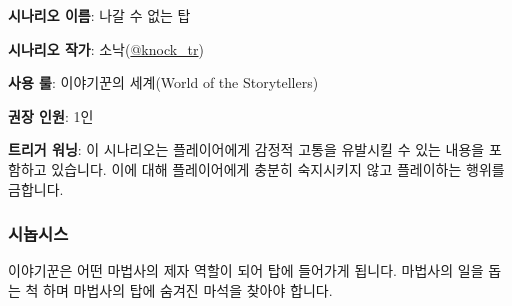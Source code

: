 \documentclass{report}
\begin{document}
	\textbf{시나리오 이름}: 나갈 수 없는 탑
	
	\textbf{시나리오 작가}: 소낙(\href{https://twitter.com/knock_tr}{@knock\_tr})
	
	\textbf{사용 룰}: 이야기꾼의 세계(World of the Storytellers)
	
	\textbf{권장 인원}: 1인
	
	\textbf{트리거 워닝}: 이 시나리오는 플레이어에게 감정적 고통을 유발시킬 수 있는 내용을 포함하고 있습니다. 이에 대해 플레이어에게 충분히 숙지시키지 않고 플레이하는 행위를 금합니다.
	
	\subsubsection*{시놉시스}
	
	이야기꾼은 어떤 마법사의 제자 역할이 되어 탑에 들어가게 됩니다. 마법사의 일을 돕는 척 하며 마법사의 탑에 숨겨진 마석을 찾아야 합니다.
\end{document}

